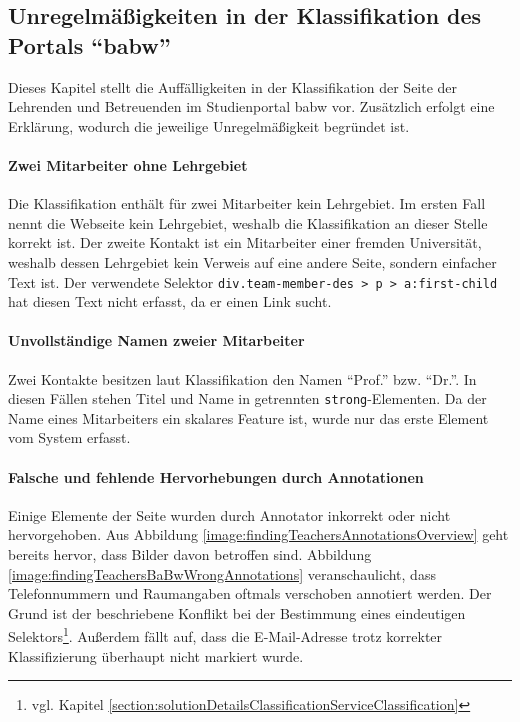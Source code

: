 \subsection{Unregelmäßigkeiten in der Klassifikation des Portals "`\acrshort{babw}"'}
    \label{section:findingsTeachersAbnormalitiesBabw}
    Dieses Kapitel stellt die Auffälligkeiten in der Klassifikation
    der Seite der Lehrenden und Betreuenden im Studienportal
    \gls{babw} vor.
    Zusätzlich erfolgt eine Erklärung,
    wodurch die jeweilige Unregelmäßigkeit begründet ist.

    \paragraph{Zwei Mitarbeiter ohne Lehrgebiet}
    Die Klassifikation enthält für zwei Mitarbeiter kein Lehrgebiet.
    Im ersten Fall nennt die Webseite kein Lehrgebiet,
    weshalb die Klassifikation an dieser Stelle korrekt ist.
    Der zweite Kontakt ist ein Mitarbeiter einer fremden Universität,
    weshalb dessen Lehrgebiet kein Verweis auf eine andere Seite,
    sondern einfacher Text ist.
    Der verwendete Selektor \texttt{div.team-member-des > p > a:first-child}
    hat diesen Text nicht erfasst, da er einen Link sucht.

    \paragraph{Unvollständige Namen zweier Mitarbeiter}
    Zwei Kontakte besitzen laut Klassifikation den Namen "`Prof."' bzw. "`Dr."'.
    In diesen Fällen stehen Titel und Name in getrennten \texttt{strong}-Elementen.
    Da der Name eines Mitarbeiters ein skalares Feature ist,
    wurde nur das erste Element vom System erfasst.

    \paragraph{Falsche und fehlende Hervorhebungen durch Annotationen}
    Einige Elemente der Seite wurden durch Annotator inkorrekt oder nicht hervorgehoben.
    Aus Abbildung \ref{image:findingTeachersAnnotationsOverview} geht bereits hervor,
    dass Bilder davon betroffen sind.
    Abbildung \ref{image:findingTeachersBaBwWrongAnnotations}
    veranschaulicht, dass Telefonnummern und Raumangaben oftmals verschoben annotiert werden.
    Der Grund ist der
    beschriebene Konflikt bei der Bestimmung eines eindeutigen
    Selektors\footnote{vgl. Kapitel \ref{section:solutionDetailsClassificationServiceClassification}}.
    Außerdem fällt auf, dass die E-Mail-Adresse trotz korrekter Klassifizierung
    überhaupt nicht markiert wurde.

